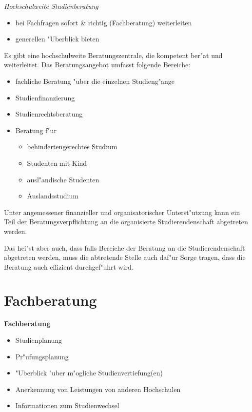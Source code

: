 \begin{kcmt}\begin{komacmt}
\emph{Hochschulweite Studienberatung}
\begin{itemize}
	\item bei Fachfragen sofort \& richtig (Fachberatung) weiterleiten
	\item generellen "Uberblick bieten
\end{itemize}
\end{komacmt}\end{kcmt}

Es gibt eine hochschulweite Beratungszentrale, die kompetent ber"at und weiterleitet.
Das Beratungsangebot umfasst folgende Bereiche:
\begin{itemize}
	\item fachliche Beratung "uber die einzelnen Studieng"ange
	\item Studienfinanzierung
	\item Studienrechtsberatung
	\item Beratung f"ur
		\begin{itemize}
			\item behindertengerechtes Studium
			\item Studenten mit Kind
			\item ausl"andische Studenten
			\item Auslandsstudium
		\end{itemize}
\end{itemize}

Unter angemessener finanzieller und organisatorischer Unterst"utzung kann ein 
Teil der Beratungsverpflichtung an die organisierte Studierendenschaft abgetreten werden.

\begin{kcmt}\begin{komacmt}
	Das hei"st aber auch, dass falls Bereiche der Beratung an die
	Studierendenschaft abgetreten werden, muss die abtretende Stelle
	auch daf"ur Sorge tragen, dass die Beratung auch effizient
	durchgef"uhrt wird.
\end{komacmt}\end{kcmt}

\section{Fachberatung}

\begin{kcmt}\begin{komacmt}
\textbf{Fachberatung}
\begin{itemize}
	\item Studienplanung
	\item Pr"ufungsplanung
	\item "Uberblick "uber m"ogliche Studienvertiefung(en)
	\item Anerkennung von Leistungen von anderen Hochschulen
	\item Informationen zum Studienwechsel
\end{itemize}
\end{komacmt}\end{kcmt}


